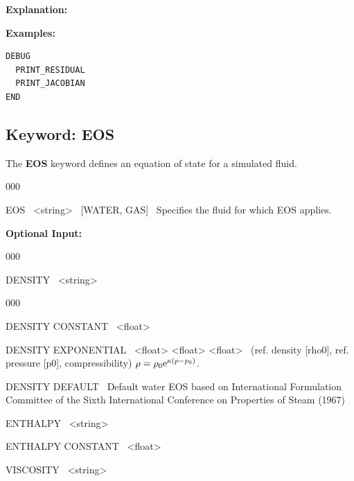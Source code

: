 {\noindent\bf Explanation:}

\bigskip

\begin{mdframed}

{\noindent\bf Examples:}
\footnotesize
\begin{verbatim}
DEBUG
  PRINT_RESIDUAL
  PRINT_JACOBIAN
END
\end{verbatim}
\normalsize
\end{mdframed}

\hyperlink{target_key}{\return}


\newpage
\protect\hypertarget{target_eos}{}

\subsection{Keyword: EOS}

\hfill\hyperlink{target_key}{\return}

The {\bf EOS} keyword defines an equation of state for a simulated fluid.

\begin{deflist}{000}
\item[EOS] \ <string> \ [WATER, GAS] \ Specifies the fluid for which EOS applies.

{\bf Optional Input:}

\begin{deflist}{000}
\item[DENSITY] \ <string> \ <optional parameters>
\begin{deflist}{000}
\item[DENSITY CONSTANT] \ <float>
\item[DENSITY EXPONENTIAL] \ <float> <float> <float> \ (ref. density [rho0], ref. pressure [p0], compressibility) 
$\rho = \rho_0 {\rm{e}}^{\kappa (p-p_0)}$.

\item[DENSITY DEFAULT] \ 
Default water EOS based on International Formulation Committee of the Sixth International Conference on Properties of Steam (1967)
\item[ENTHALPY] \ <string> \ <optional parameters>
\item[ENTHALPY CONSTANT] \ <float>
\item[VISCOSITY] \ <string> \ <optional parameters>
\end{deflist}
\end{deflist}
\item[\keyend] ~
\end{deflist}

